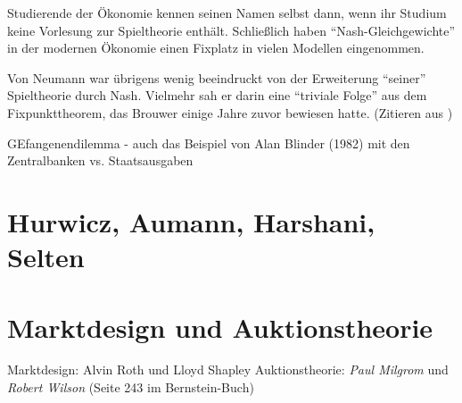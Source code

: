 Studierende der Ökonomie kennen seinen Namen selbst dann, wenn ihr Studium keine Vorlesung zur Spieltheorie enthält. Schließlich haben "`Nash-Gleichgewichte"' in der modernen Ökonomie einen Fixplatz in vielen Modellen eingenommen. 


Von Neumann war übrigens wenig beeindruckt von der Erweiterung "`seiner"' Spieltheorie durch Nash. Vielmehr sah er darin eine "`triviale Folge"' aus dem Fixpunkttheorem, das Brouwer einige Jahre zuvor bewiesen hatte. (Zitieren aus \textcite{Cassidy2015} )


GEfangenendilemma - auch das Beispiel von Alan Blinder (1982) mit den Zentralbanken vs. Staatsausgaben







\section{Hurwicz, Aumann, Harshani, Selten}

\section{Marktdesign und Auktionstheorie}

Marktdesign: Alvin Roth und Lloyd Shapley 
Auktionstheorie: \textit{Paul Milgrom} und \textit{Robert Wilson} (Seite 243 im Bernstein-Buch)




